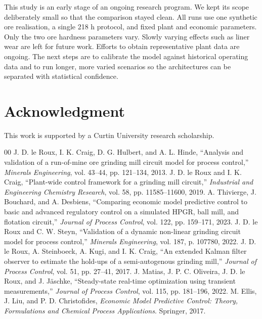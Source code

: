 \documentclass[conference]{IEEEtran}
\begin{document}
This study is an early stage of an ongoing research program. We kept
its scope deliberately small so that the comparison stayed clean. All
runs use one synthetic ore realisation, a single 218 h protocol, and
fixed plant and economic parameters. Only the two ore hardness
parameters vary. Slowly varying effects such as liner wear are left
for future work. Efforts to obtain representative plant data are
ongoing. The next steps are to calibrate the model against historical
operating data and to run longer, more varied scenarios so the
architectures can be separated with statistical confidence.

\section*{Acknowledgment}

This work is supported by a Curtin University research scholarship.

\begin{thebibliography}{00}
 J. D. le Roux, I. K. Craig, D. G. Hulbert, and A. L.
Hinde, ``Analysis and validation of a run-of-mine ore grinding mill
circuit model for process control,'' \emph{Minerals Engineering}, vol.
43--44, pp. 121--134, 2013.
 J. D. le Roux and I. K. Craig, ``Plant-wide control
framework for a grinding mill circuit,'' \emph{Industrial and Engineering
Chemistry Research}, vol. 58, pp. 11585--11600, 2019.
 A. Thivierge, J. Bouchard, and A. Desbiens,
``Comparing economic model predictive control to basic and advanced
regulatory control on a simulated HPGR, ball mill, and flotation
circuit,'' \emph{Journal of Process Control}, vol. 122, pp. 159--171,
2023.
 J. D. le Roux and C. W. Steyn, ``Validation of a
dynamic non-linear grinding circuit model for process control,''
\emph{Minerals Engineering}, vol. 187, p. 107780, 2022.
 J. D. le Roux, A. Steinboeck, A. Kugi, and I. K.
Craig, ``An extended Kalman filter observer to estimate the hold-ups of a
semi-autogenous grinding mill,'' \emph{Journal of Process Control}, vol.
51, pp. 27--41, 2017.
 J. Matias, J. P. C. Oliveira, J. D. le Roux, and J.
J\"{a}schke, ``Steady-state real-time optimization using transient
measurements,'' \emph{Journal of Process Control}, vol. 115, pp. 181--196,
2022.
 M. Ellis, J. Liu, and P. D. Christofides,
\emph{Economic Model Predictive Control: Theory, Formulations and Chemical
Process Applications}. Springer, 2017.
\end{thebibliography}
\end{document}
